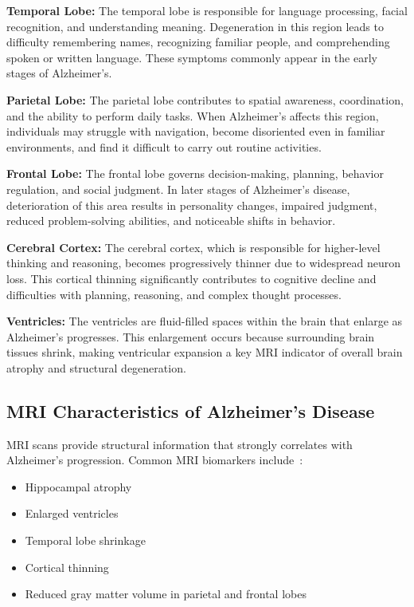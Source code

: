 \noindent\textbf{Temporal Lobe:} 
The temporal lobe is responsible for language processing, facial recognition, and understanding meaning. Degeneration in this region leads to difficulty remembering names, recognizing familiar people, and comprehending spoken or written language. These symptoms commonly appear in the early stages of Alzheimer’s.

\noindent\textbf{Parietal Lobe:} 
The parietal lobe contributes to spatial awareness, coordination, and the ability to perform daily tasks. When Alzheimer’s affects this region, individuals may struggle with navigation, become disoriented even in familiar environments, and find it difficult to carry out routine activities.

\noindent\textbf{Frontal Lobe:} 
The frontal lobe governs decision-making, planning, behavior regulation, and social judgment. In later stages of Alzheimer’s disease, deterioration of this area results in personality changes, impaired judgment, reduced problem-solving abilities, and noticeable shifts in behavior.

\noindent\textbf{Cerebral Cortex:} 
The cerebral cortex, which is responsible for higher-level thinking and reasoning, becomes progressively thinner due to widespread neuron loss. This cortical thinning significantly contributes to cognitive decline and difficulties with planning, reasoning, and complex thought processes.

\noindent\textbf{Ventricles:} 
The ventricles are fluid-filled spaces within the brain that enlarge as Alzheimer’s progresses. This enlargement occurs because surrounding brain tissues shrink, making ventricular expansion a key MRI indicator of overall brain atrophy and structural degeneration.

\subsection{MRI Characteristics of Alzheimer’s Disease}
MRI scans provide structural information that strongly correlates with Alzheimer’s progression. Common MRI biomarkers include~\cite{frisoni2010clinical,jack2018niaaa}: \\
\begin{itemize}
    \item Hippocampal atrophy
    \item Enlarged ventricles
    \item Temporal lobe shrinkage
    \item Cortical thinning
    \item Reduced gray matter volume in parietal and frontal lobes
\end{itemize}

